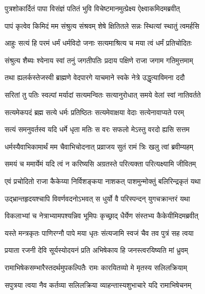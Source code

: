 
\twolineshloka
{पुत्रशोकार्दितं पापा विसंज्ञं पतितं भुवि}
{विचेष्टमानमुत्प्रेक्ष्य ऐक्ष्वाकमिदमब्रवीत्} %

\twolineshloka
{पापं कृत्वेव किमिदं मम संश्रुत्य संश्रवम्}
{शेषे क्षितितले सन्नः स्थित्यां स्थातुं त्वमर्हसि} %

\twolineshloka
{आहुः सत्यं हि परमं धर्मं धर्मविदो जनाः}
{सत्यमाश्रित्य च मया त्वं धर्मं प्रतिचोदितः} %

\twolineshloka
{संश्रुत्य शैब्यः श्येनाय स्वां तनुं जगतीपतिः}
{प्रदाय पक्षिणे राजा जगाम गतिमुत्तमाम्} %

\twolineshloka
{तथा ह्यलर्कस्तेजस्वी ब्राह्मणे वेदपारगे}
{याचमाने स्वके नेत्रे उद्धृत्याविमना ददौ} %

\twolineshloka
{सरितां तु पतिः स्वल्पां मर्यादां सत्यमन्वितः}
{सत्यानुरोधात् समये वेलां स्वां नातिवर्तते} %

\twolineshloka
{सत्यमेकपदं ब्रह्म सत्ये धर्मः प्रतिष्ठितः}
{सत्यमेवाक्षया वेदाः सत्येनावाप्यते परम्} %

\twolineshloka
{सत्यं समनुवर्तस्व यदि धर्मे धृता मतिः}
{स वरः सफलो मेऽस्तु वरदो ह्यसि सत्तम} %

\twolineshloka
{धर्मस्यैवाभिकामार्थं मम चैवाभिचोदनात्}
{प्रव्राजय सुतं रामं त्रिः खलु त्वां ब्रवीम्यहम्} %

\twolineshloka
{समयं च ममार्येमं यदि त्वं न करिष्यसि}
{अग्रतस्ते परित्यक्ता परित्यक्ष्यामि जीवितम्} %

\twolineshloka
{एवं प्रचोदितो राजा कैकेय्या निर्विशङ्कया}
{नाशकत् पाशमुन्मोक्तुं बलिरिन्द्रकृतं यथा} %

\twolineshloka
{उद्भ्रान्तहृदयश्चापि विवर्णवदनोऽभवत्}
{स धुर्यो वै परिस्पन्दन् युगचक्रान्तरं यथा} %

\twolineshloka
{विकलाभ्यां च नेत्राभ्यामपश्यन्निव भूमिपः}
{कृच्छ्राद् धैर्येण संस्तभ्य कैकेयीमिदमब्रवीत्} %

\twolineshloka
{यस्ते मन्त्रकृतः पाणिरग्नौ पापे मया धृतः}
{संत्यजामि स्वजं चैव तव पुत्रं सह त्वया} %

\twolineshloka
{प्रयाता रजनी देवि सूर्यस्योदयनं प्रति}
{अभिषेकाय हि जनस्त्वरयिष्यति मां ध्रुवम्} %

\twolineshloka
{रामाभिषेकसम्भारैस्तदर्थमुपकल्पितैः}
{रामः कारयितव्यो मे मृतस्य सलिलक्रियाम्} %

\twolineshloka
{सपुत्रया त्वया नैव कर्तव्या सलिलक्रिया}
{व्याहन्तास्यशुभाचारे यदि रामाभिषेचनम्} %

